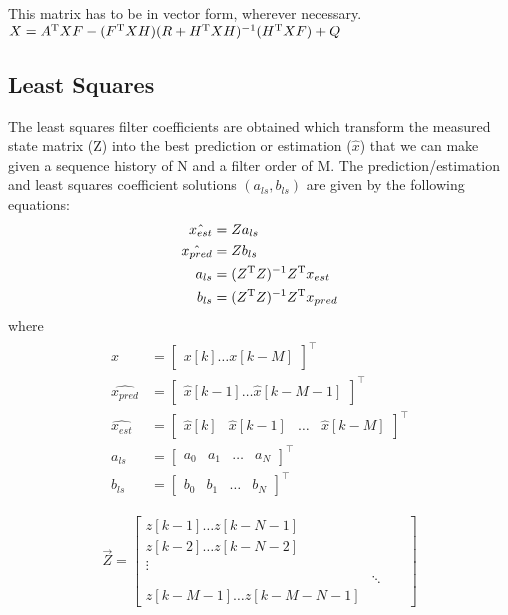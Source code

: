 \documentclass[twocolumn,letterpaper]{IEEEAerospaceCLS}  %
\begin{document}
{\color{red} This matrix has to be in vector form, wherever necessary.} 
$X=A^{\rm T}XF-(F^{\rm T}XH)(R+H^{\rm T}XH)^{-1}(H^{\rm T}XF) + Q $


\subsection{Least Squares}
The least squares filter coefficients are obtained which transform the measured state matrix (Z) into the best prediction or estimation ($\hat{x}$) that we can make given a sequence history of N and a filter order of M. The prediction/estimation and least squares coefficient solutions $(a_{ls}, b_{ls})$ are given by the following equations:
\begin{align}
\begin{aligned}
\hat{x_{est}}&= Za_{ls} \\ 
\hat{x_{pred}}&= Zb_{ls} \\ 
a_{ls}&= (Z^{\rm T}Z)^{-1}Z^{\rm T}x_{est} \\
b_{ls}&= (Z^{\rm T}Z)^{-1}Z^{\rm T}x_{pred}
\end{aligned}
\end{align}
where
\begin{align}
\begin{aligned}
x&= \left[ \begin{matrix}  x[k]   \dots    x[k-M] \end{matrix} \right]^\top\\
\hat{x_{pred}} &= \left[ \begin{matrix} \hat{x}[k-1]  \dots \hat{x}[k-M-1]\end{matrix} \right]^\top\\
\hat{x_{est}}&= \left[ \begin{matrix}   \hat{x}[k]  & \hat{x}[k-1]  &  \dots & \hat{x}[k-M] \end{matrix}\right]^\top\\
a_{ls}&=  \left[ \begin{matrix}    a_{0} &  a_{1} &  \dots  & a_{N} \end{matrix} \right]^\top\\
b_{ls}&= \left[ \begin{matrix}   b_{0}   & b_{1}  & \dots &  b_{N}\end{matrix}\right]^\top
\end{aligned}
\end{align}


\begin{equation}
\vec{Z} =  \left[ \begin{matrix}   z[k-1]  \dots  z[k-N-1]  \\ z[k-2]   \dots  z[k-N-2]  \\   \vdots \\    &  \ddots   &              & \\
   z[k-M-1] \dots z[k-M-N-1]  \end{matrix}\right]
\end{equation}
\end{document}
